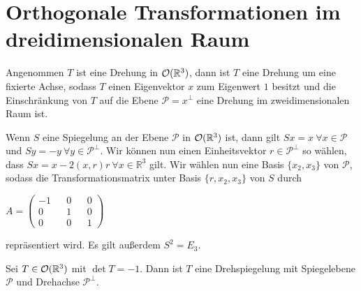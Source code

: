 \section{Orthogonale Transformationen im dreidimensionalen Raum}
\begin{theorem}
 Angenommen $T$ ist eine Drehung in ${\mathcal{O}(\mathbb{R}^3)}$, dann ist $T$ eine Drehung um eine fixierte Achse, sodass $T$ einen Eigenvektor $x$ zum Eigenwert $1$ besitzt und die Einschränkung von $T$ auf die Ebene $\mathcal{P}=x^{\perp}$ eine Drehung im zweidimensionalen Raum ist.
\end{theorem}
\begin{bem}
 Wenn $S$ eine Spiegelung an der Ebene $\mathcal{P}$ in ${\mathcal{O}(\mathbb{R}^3)}$ ist, dann gilt $Sx=x \ \forall x \in \mathcal{P}$ und $Sy=-y \ \forall y \in \mathcal{P}^{\perp}$. Wir können nun einen Einheitsvektor $r \in \mathcal{P}^{\perp}$ so wählen, dass $Sx=x-2(x,r)r \ \forall x\in \mathbb{R}^3$ gilt. Wir wählen nun eine Basis $\{x_2,x_3\}$ von $\mathcal{P}$, sodass die Transformationsmatrix unter Basis $\{r,x_2,x_3\}$ von $S$ durch 
 \begin{center}
  $A= \begin{pmatrix}
        -1 && 0 && 0 \\
        0 && 1 && 0 \\
        0 && 0 && 1 
       \end{pmatrix}$
 \end{center}
repräsentiert wird. Es gilt außerdem $S^2 = E_3$.
\end{bem}
\begin{theorem}
 Sei $T\in{\mathcal{O}(\mathbb{R}^3)}$ mit $\det T = -1$. Dann ist $T$ eine Drehspiegelung mit Spiegelebene $\mathcal{P}$ und Drehachse $\mathcal{P}^{\perp}$.
\end{theorem}
